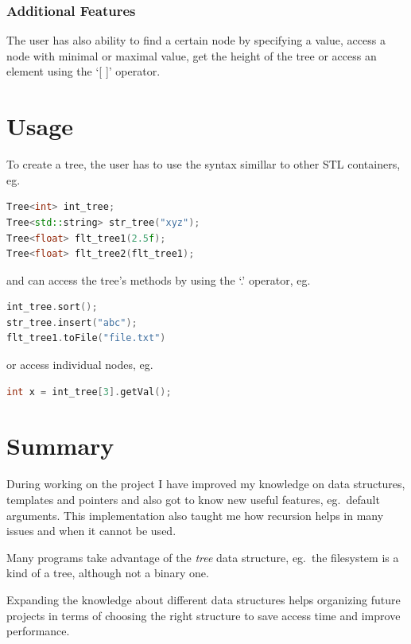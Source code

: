 \documentclass[12pt]{article}
\begin{document}
\subsubsection{Additional Features}
The user has also ability to find a certain node by specifying a value, access a node with minimal or maximal value, get the height of the tree or access an element using the `[  ]' operator.

\section{Usage}
To create a tree, the user has to use the syntax simillar to other STL containers, eg.\
\begin{footnotesize}
\begin{lstlisting}[language=C++]
Tree<int> int_tree;
Tree<std::string> str_tree("xyz");
Tree<float> flt_tree1(2.5f); 
Tree<float> flt_tree2(flt_tree1); 
\end{lstlisting}
\end{footnotesize}

and can access the tree's methods by using the `.' operator, eg.\
\begin{footnotesize}
\begin{lstlisting}[language=C++]
int_tree.sort();
str_tree.insert("abc");
flt_tree1.toFile("file.txt")
\end{lstlisting}
\end{footnotesize}

or access individual nodes, eg.\
\begin{footnotesize}
\begin{lstlisting}[language=C++]
int x = int_tree[3].getVal();
\end{lstlisting}
\end{footnotesize}

\section{Summary}
During working on the project I have improved my knowledge on data structures, templates and pointers and also got to know new useful features, eg.\ default arguments. This implementation also taught me how recursion helps in many issues and when it cannot be used.

Many programs take advantage of the \textit{tree} data structure, eg.\ the filesystem is a kind of a tree, although not a binary one. 

Expanding the knowledge about different data structures helps organizing future projects in terms of choosing the right structure to save access time and improve performance.
\end{document}
